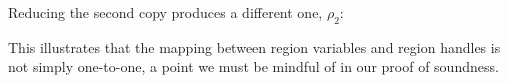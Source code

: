 Reducing the second copy produces a different one, $\rho_2$:


This illustrates that the mapping between region variables and region handles is not simply one-to-one, a point we must be mindful of in our proof of soundness.

